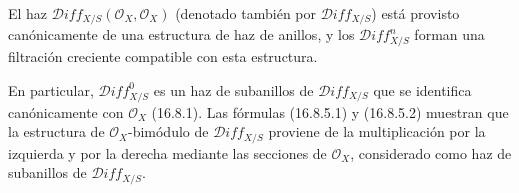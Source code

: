 \begin{corollary}[16.8.10]
\label{IV.16.8.10}
El haz $\mathscr{D}\!iff_{X/S}(\mathcal{O}_X,\mathcal{O}_X)$ (denotado también
por $\mathscr{D}\!iff_{X/S}$) está provisto canónicamente de una estructura de
haz de anillos, y los $\mathscr{D}\!iff_{X/S}^n$ forman una filtración
creciente compatible con esta estructura.
\end{corollary}

En particular, $\mathscr{D}\!iff_{X/S}^0$ es un haz de subanillos de
$\mathscr{D}\!iff_{X/S}$ que se identifica canónicamente con $\mathcal{O}_X$
(16.8.1). Las fórmulas (16.8.5.1) y (16.8.5.2) muestran que la estructura de
$\mathcal{O}_X$-bimódulo de $\mathscr{D}\!iff_{X/S}$ proviene de la
multiplicación por la izquierda y por la derecha mediante las secciones de
$\mathcal{O}_X$, considerado como haz de subanillos de
$\mathscr{D}\!iff_{X/S}$.

